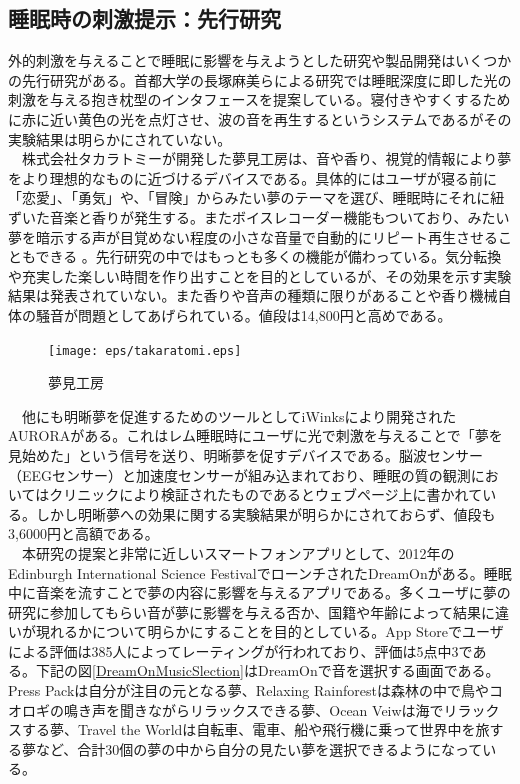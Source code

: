\subsection{睡眠時の刺激提示：先行研究}
外的刺激を与えることで睡眠に影響を与えようとした研究や製品開発はいくつかの先行研究がある。首都大学の長塚麻美らによる研究では睡眠深度に即した光の刺激を与える抱き枕型のインタフェースを提案している\cite{sleepSheep}。寝付きやすくするために赤に近い黄色の光を点灯させ、波の音を再生するというシステムであるがその実験結果は明らかにされていない。\\
　株式会社タカラトミーが開発した夢見工房は、音や香り、視覚的情報により夢をより理想的なものに近づけるデバイスである。具体的にはユーザが寝る前に「恋愛」、「勇気」や、「冒険」からみたい夢のテーマを選び、睡眠時にそれに紐ずいた音楽と香りが発生する。またボイスレコーダー機能もついており、みたい夢を暗示する声が目覚めない程度の小さな音量で自動的にリピート再生させることもできる \cite{takaratomi}。先行研究の中ではもっとも多くの機能が備わっている。気分転換や充実した楽しい時間を作り出すことを目的としているが、その効果を示す実験結果は発表されていない。また香りや音声の種類に限りがあることや香り機械自体の騒音が問題としてあげられている。値段は14,800円と高めである。\\
\begin{figure}[htbp]
\begin{center}
\texttt{[image: eps/takaratomi.eps]}
\caption{夢見工房}
\label{takaratomi}
\end{center}
\end{figure}
　他にも明晰夢を促進するためのツールとしてiWinksにより開発されたAURORAがある\cite{iWinks}。これはレム睡眠時にユーザに光で刺激を与えることで「夢を見始めた」という信号を送り、明晰夢を促すデバイスである。脳波センサー（EEGセンサー）と加速度センサーが組み込まれており、睡眠の質の観測においてはクリニックにより検証されたものであるとウェブページ上に書かれている。しかし明晰夢への効果に関する実験結果が明らかにされておらず、値段も3,6000円と高額である。\\
　本研究の提案と非常に近しいスマートフォンアプリとして、2012年のEdinburgh International Science FestivalでローンチされたDreamOnがある\cite{dreamOn}。睡眠中に音楽を流すことで夢の内容に影響を与えるアプリである。多くユーザに夢の研究に参加してもらい音が夢に影響を与える否か、国籍や年齢によって結果に違いが現れるかについて明らかにすることを目的としている。App Storeでユーザによる評価は385人によってレーティングが行われており、評価は5点中3である。下記の図\ref{DreamOnMusicSlection}はDreamOnで音を選択する画面である。Press Packは自分が注目の元となる夢、Relaxing Rainforestは森林の中で鳥やコオロギの鳴き声を聞きながらリラックスできる夢、Ocean Veiwは海でリラックスする夢、Travel the Worldは自転車、電車、船や飛行機に乗って世界中を旅する夢など、合計30個の夢の中から自分の見たい夢を選択できるようになっている。
